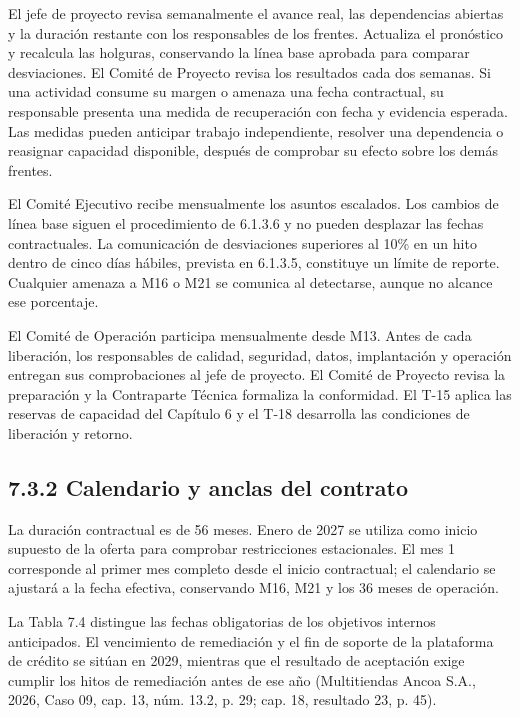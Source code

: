 \documentclass[11pt]{article}
\begin{document}
El jefe de proyecto revisa semanalmente el avance real, las dependencias abiertas y la duración restante con los responsables de los frentes. Actualiza el pronóstico y recalcula las holguras, conservando la línea base aprobada para comparar desviaciones. El Comité de Proyecto revisa los resultados cada dos semanas. Si una actividad consume su margen o amenaza una fecha contractual, su responsable presenta una medida de recuperación con fecha y evidencia esperada. Las medidas pueden anticipar trabajo independiente, resolver una dependencia o reasignar capacidad disponible, después de comprobar su efecto sobre los demás frentes.

El Comité Ejecutivo recibe mensualmente los asuntos escalados. Los cambios de línea base siguen el procedimiento de 6.1.3.6 y no pueden desplazar las fechas contractuales. La comunicación de desviaciones superiores al 10\% en un hito dentro de cinco días hábiles, prevista en 6.1.3.5, constituye un límite de reporte. Cualquier amenaza a M16 o M21 se comunica al detectarse, aunque no alcance ese porcentaje.

El Comité de Operación participa mensualmente desde M13. Antes de cada liberación, los responsables de calidad, seguridad, datos, implantación y operación entregan sus comprobaciones al jefe de proyecto. El Comité de Proyecto revisa la preparación y la Contraparte Técnica formaliza la conformidad. El T-15 aplica las reservas de capacidad del Capítulo 6 y el T-18 desarrolla las condiciones de liberación y retorno.

\subsection{7.3.2 Calendario y anclas del contrato}

La duración contractual es de 56 meses. Enero de 2027 se utiliza como inicio supuesto de la oferta para comprobar restricciones estacionales. El mes 1 corresponde al primer mes completo desde el inicio contractual; el calendario se ajustará a la fecha efectiva, conservando M16, M21 y los 36 meses de operación.

La Tabla 7.4 distingue las fechas obligatorias de los objetivos internos anticipados. El vencimiento de remediación y el fin de soporte de la plataforma de crédito se sitúan en 2029, mientras que el resultado de aceptación exige cumplir los hitos de remediación antes de ese año (Multitiendas Ancoa S.A., 2026, Caso 09, cap. 13, núm. 13.2, p. 29; cap. 18, resultado 23, p. 45).
\end{document}
